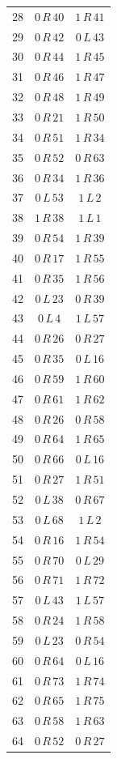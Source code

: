 \begin{longtable}{rcc}
28 & $0\,R\,40$ & $1\,R\,41$\\
29 & $0\,R\,42$ & $0\,L\,43$\\
30 & $0\,R\,44$ & $1\,R\,45$\\
31 & $0\,R\,46$ & $1\,R\,47$\\
32 & $0\,R\,48$ & $1\,R\,49$\\
33 & $0\,R\,21$ & $1\,R\,50$\\
34 & $0\,R\,51$ & $1\,R\,34$\\
35 & $0\,R\,52$ & $0\,R\,63$\\
36 & $0\,R\,34$ & $1\,R\,36$\\
37 & $0\,L\,53$ & $1\,L\,2$\\
38 & $1\,R\,38$ & $1\,L\,1$\\
39 & $0\,R\,54$ & $1\,R\,39$\\
40 & $0\,R\,17$ & $1\,R\,55$\\
41 & $0\,R\,35$ & $1\,R\,56$\\
42 & $0\,L\,23$ & $0\,R\,39$\\
43 & $0\,L\,4$ & $1\,L\,57$\\
44 & $0\,R\,26$ & $0\,R\,27$\\
45 & $0\,R\,35$ & $0\,L\,16$\\
46 & $0\,R\,59$ & $1\,R\,60$\\
47 & $0\,R\,61$ & $1\,R\,62$\\
48 & $0\,R\,26$ & $0\,R\,58$\\
49 & $0\,R\,64$ & $1\,R\,65$\\
50 & $0\,R\,66$ & $0\,L\,16$\\
51 & $0\,R\,27$ & $1\,R\,51$\\
52 & $0\,L\,38$ & $0\,R\,67$\\
53 & $0\,L\,68$ & $1\,L\,2$\\
54 & $0\,R\,16$ & $1\,R\,54$\\
55 & $0\,R\,70$ & $0\,L\,29$\\
56 & $0\,R\,71$ & $1\,R\,72$\\
57 & $0\,L\,43$ & $1\,L\,57$\\
58 & $0\,R\,24$ & $1\,R\,58$\\
59 & $0\,L\,23$ & $0\,R\,54$\\
60 & $0\,R\,64$ & $0\,L\,16$\\
61 & $0\,R\,73$ & $1\,R\,74$\\
62 & $0\,R\,65$ & $1\,R\,75$\\
63 & $0\,R\,58$ & $1\,R\,63$\\
64 & $0\,R\,52$ & $0\,R\,27$\\

\end{longtable}
